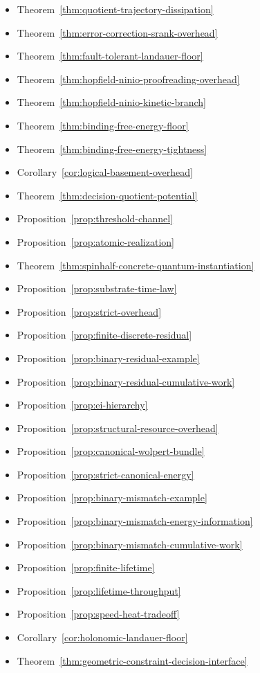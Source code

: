 \begin{itemize}
\item Theorem~\ref{thm:quotient-trajectory-dissipation}
\item Theorem~\ref{thm:error-correction-srank-overhead}
\item Theorem~\ref{thm:fault-tolerant-landauer-floor}
\item Theorem~\ref{thm:hopfield-ninio-proofreading-overhead}
\item Theorem~\ref{thm:hopfield-ninio-kinetic-branch}
\item Theorem~\ref{thm:binding-free-energy-floor}
\item Theorem~\ref{thm:binding-free-energy-tightness}
\item Corollary~\ref{cor:logical-basement-overhead}
\item Theorem~\ref{thm:decision-quotient-potential}
\item Proposition~\ref{prop:threshold-channel}
\item Proposition~\ref{prop:atomic-realization}
\item Theorem~\ref{thm:spinhalf-concrete-quantum-instantiation}
\item Proposition~\ref{prop:substrate-time-law}
\item Proposition~\ref{prop:strict-overhead}
\item Proposition~\ref{prop:finite-discrete-residual}
\item Proposition~\ref{prop:binary-residual-example}
\item Proposition~\ref{prop:binary-residual-cumulative-work}
\item Proposition~\ref{prop:ei-hierarchy}
\item Proposition~\ref{prop:structural-resource-overhead}
\item Proposition~\ref{prop:canonical-wolpert-bundle}
\item Proposition~\ref{prop:strict-canonical-energy}
\item Proposition~\ref{prop:binary-mismatch-example}
\item Proposition~\ref{prop:binary-mismatch-energy-information}
\item Proposition~\ref{prop:binary-mismatch-cumulative-work}
\item Proposition~\ref{prop:finite-lifetime}
\item Proposition~\ref{prop:lifetime-throughput}
\item Proposition~\ref{prop:speed-heat-tradeoff}
\item Corollary~\ref{cor:holonomic-landauer-floor}
\item Theorem~\ref{thm:geometric-constraint-decision-interface}
\end{itemize}

